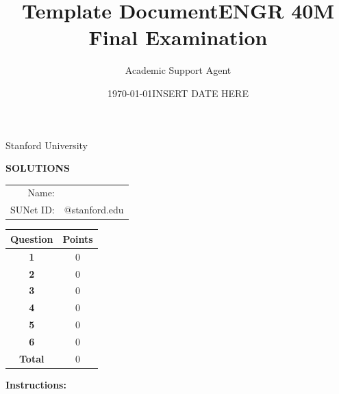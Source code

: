 \documentclass{article}
\title{Template Document}
\author{Academic Support Agent}
\date{\today}
\begin{document}
\maketitle

\title{ENGR 40M Final Examination}
\date{INSERT DATE HERE}

\begin{center}
    \Large
    {\bfseries\makeatletter\@title\makeatother}

    \bigskip

    Stanford University

    \makeatletter\@date\makeatother

    \ifanswer
        \vspace{1pc}

        {\sffamily\bfseries SOLUTIONS}

        \vspace{1pc}
    \else
        \vfill

        \begin{tabular}{rp{10cm}}
            Name: & \hrulefill \\[1pc]
            SUNet ID: & \hrulefill @stanford.edu
        \end{tabular}

        \vfill
    \fi

    \normalsize
    \begin{tabular}{| >{\bfseries}c | c |}
        \hline
        Question & \bfseries Points \\
        \hline
        \hline
         1 &  0 \\ \hline
         2 &  0 \\ \hline
         3 &  0 \\ \hline
         4 &  0 \\ \hline
         5 &  0 \\ \hline
         6 &  0 \\ \hline
        \hline
        Total & 0 \\
        \hline
    \end{tabular}

\end{center}

\ifanswer\else

    \vfill

    \textbf{Instructions:}
\end{document}
